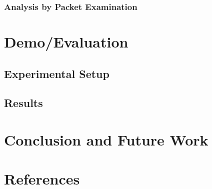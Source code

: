 \documentclass[12pt]{article}
\begin{document}
\subsubsection{Analysis by Packet Examination}

\newpage
\section{Demo/Evaluation}
\subsection{Experimental Setup}
\par %

\subsection{Results}
\par %

\section{Conclusion and Future Work}
\par %





\newpage
\section{References}

\printbibliography
\end{document}
